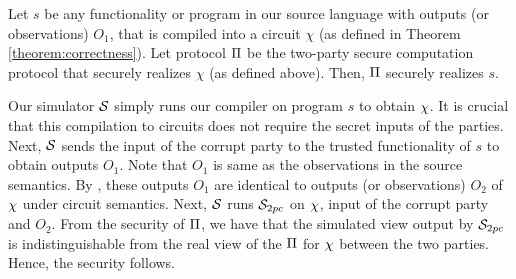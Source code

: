 \begin{theorem}[Security]\label{theorem:security}
Let $s$ be any functionality or program in our source language with outputs (or observations) $O_1$, that is compiled into a circuit $\chi$ (as defined in Theorem \ref{theorem:correctness}). Let protocol $\Pi$ be the two-party secure computation protocol that securely realizes $\chi$ (as defined above). Then, $\Pi$ securely realizes $s$.  
\end{theorem}

Our simulator $\mathcal{S}$ simply runs our compiler on program $s$ to obtain $\chi$. It is crucial that this compilation to circuits does not require the secret inputs of the parties. Next, $\mathcal{S}$ sends the input of the corrupt party to the trusted functionality of $s$ to obtain outputs $O_1$. Note that $O_1$ is same as the observations in the source semantics. 
By , these outputs $O_1$ are identical to outputs (or observations) $O_2$ of $\chi$ under circuit semantics. 
Next, $\mathcal{S}$ runs $\simu_{\tiny{2pc}}$ on $\chi$, input of the corrupt party and $O_2$. 
From the security of $\Pi$, we have that the simulated view output by $\simu_{\tiny{2pc}}$ is indistinguishable from the real view of the $\Pi$ for $\chi$ between the two parties. Hence, the security follows.
 

